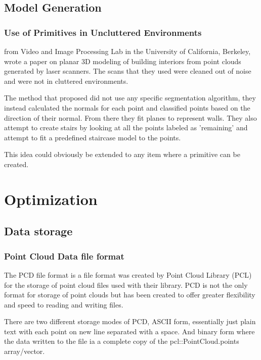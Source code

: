 	
	\subsection{Model Generation}
		\subsubsection{Use of Primitives in Uncluttered Environments}
		\cite{sanchez_planar_2012} from Video and Image Processing Lab in the University of California, Berkeley, wrote a paper on planar 3D modeling of building interiors from point clouds generated by laser scanners. The scans that they used were cleaned out of noise and were not in cluttered environments.
			
		The method that \citeauthor{sanchez_planar_2012} proposed did not use any specific segmentation algorithm, they instead calculated the normals for each point and classified points based on the direction of their normal. From there they fit planes to represent walls. They also attempt to create stairs by looking at all the points labeled as 'remaining' and attempt to fit a predefined staircase model to the points.
			
		This idea could obviously be extended to any item where a primitive can be created. 

	
\section{Optimization}
	\subsection{Data storage}
	
		\subsubsection{Point Cloud Data file format}
			The PCD file format is a file format was created by Point Cloud Library (PCL) for the storage of point cloud files used with their library. PCD is not the only format for storage of point clouds but has been created to offer greater flexibility and speed to reading and writing files.
			
			There are two different storage modes of PCD, ASCII form, essentially just plain text with each point on new line separated with a space. And binary form where the data written to the file ia a complete copy of the pcl::PointCloud.points array/vector.
			
